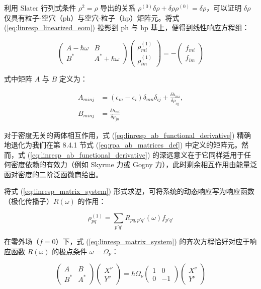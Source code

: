 利用 Slater 行列式条件 $\rho^{2}=\rho$ 导出的关系 $\rho^{(0)}\delta\rho+\delta\rho\rho^{(0)}=\delta\rho$，可以证明
$\delta\rho$ 仅具有粒子-空穴（ph）与空穴-粒子（hp）矩阵元。将式 (\ref{eq:linresp_linearized_eom})
投影到 ph 与 hp 基上，便得到线性响应方程组：

\begin{equation}
\begin{pmatrix}A-\hbar\omega & B\\
B^{*} & A^{*}+\hbar\omega
\end{pmatrix}\begin{pmatrix}\rho^{(1)}_{mi}\\
\rho^{(1)}_{im}
\end{pmatrix}=-\begin{pmatrix}f_{mi}\\
f_{im}
\end{pmatrix}\label{eq:linresp_matrix_system}
\end{equation}

式中矩阵 $A$ 与 $B$ 定义为：

\begin{align}
A_{minj} & =(\epsilon_{m}-\epsilon_{i})\delta_{mn}\delta_{ij}+\frac{\delta h_{mi}}{\delta\rho_{nj}},\nonumber \\
B_{minj} & =\frac{\delta h_{mi}}{\delta\rho_{jn}}\label{eq:linresp_ab_functional_derivative}
\end{align}

对于密度无关的两体相互作用，式 (\ref{eq:linresp_ab_functional_derivative}) 精确地退化为我们在第
8.4.1 节式 (\ref{eq:rpa_ab_matrices_def}) 中定义的矩阵元。然而，式 (\ref{eq:linresp_ab_functional_derivative})
的深远意义在于它同样适用于任何密度依赖的有效力（例如 Skyrme 力或 Gogny 力），此时剩余相互作用由能量泛函对密度的二阶泛函微商给出。

将式 (\ref{eq:linresp_matrix_system}) 形式求逆，可将系统的动态响应写为响应函数（极化传播子）$R(\omega)$
的作用：

\begin{equation}
\rho^{(1)}_{pq}=\sum_{p'q'}R_{pq,p'q'}(\omega)f_{p'q'}\label{eq:linresp_response_function_action}
\end{equation}

在零外场（$f=0$）下，式 (\ref{eq:linresp_matrix_system}) 的齐次方程恰好对应于响应函数 $R(\omega)$
的极点条件 $\omega=\Omega_{\nu}$：

\begin{equation}
\begin{pmatrix}A & B\\
B^{*} & A^{*}
\end{pmatrix}\begin{pmatrix}X^{\nu}\\
Y^{\nu}
\end{pmatrix}=\hbar\Omega_{\nu}\begin{pmatrix}1 & 0\\
0 & -1
\end{pmatrix}\begin{pmatrix}X^{\nu}\\
Y^{\nu}
\end{pmatrix}\label{eq:linresp_rpa_eigen_recovered}
\end{equation}

